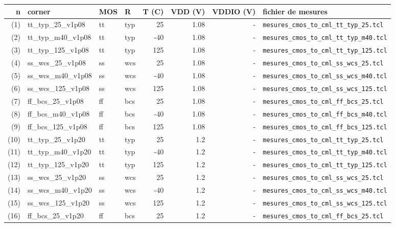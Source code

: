 \documentclass[a4paper,10pt,landscape]{article}
\begin{document}
\begin{longtable}{rlllrrrl}\toprule
n & corner & MOS & R & T (C) & VDD (V) & VDDIO (V) & fichier de mesures \\ \midrule\endhead
(1) & tt\_typ\_25\_v1p08 & tt & typ & 25 & 1.08 & - & {\small\texttt{mesures\_cmos\_to\_cml\_tt\_typ\_25.tcl}} \\
(2) & tt\_typ\_m40\_v1p08 & tt & typ & -40 & 1.08 & - & {\small\texttt{mesures\_cmos\_to\_cml\_tt\_typ\_m40.tcl}} \\
(3) & tt\_typ\_125\_v1p08 & tt & typ & 125 & 1.08 & - & {\small\texttt{mesures\_cmos\_to\_cml\_tt\_typ\_125.tcl}} \\
(4) & ss\_wcs\_25\_v1p08 & ss & wcs & 25 & 1.08 & - & {\small\texttt{mesures\_cmos\_to\_cml\_ss\_wcs\_25.tcl}} \\
(5) & ss\_wcs\_m40\_v1p08 & ss & wcs & -40 & 1.08 & - & {\small\texttt{mesures\_cmos\_to\_cml\_ss\_wcs\_m40.tcl}} \\
(6) & ss\_wcs\_125\_v1p08 & ss & wcs & 125 & 1.08 & - & {\small\texttt{mesures\_cmos\_to\_cml\_ss\_wcs\_125.tcl}} \\
(7) & ff\_bcs\_25\_v1p08 & ff & bcs & 25 & 1.08 & - & {\small\texttt{mesures\_cmos\_to\_cml\_ff\_bcs\_25.tcl}} \\
(8) & ff\_bcs\_m40\_v1p08 & ff & bcs & -40 & 1.08 & - & {\small\texttt{mesures\_cmos\_to\_cml\_ff\_bcs\_m40.tcl}} \\
(9) & ff\_bcs\_125\_v1p08 & ff & bcs & 125 & 1.08 & - & {\small\texttt{mesures\_cmos\_to\_cml\_ff\_bcs\_125.tcl}} \\
(10) & tt\_typ\_25\_v1p20 & tt & typ & 25 & 1.2 & - & {\small\texttt{mesures\_cmos\_to\_cml\_tt\_typ\_25.tcl}} \\
(11) & tt\_typ\_m40\_v1p20 & tt & typ & -40 & 1.2 & - & {\small\texttt{mesures\_cmos\_to\_cml\_tt\_typ\_m40.tcl}} \\
(12) & tt\_typ\_125\_v1p20 & tt & typ & 125 & 1.2 & - & {\small\texttt{mesures\_cmos\_to\_cml\_tt\_typ\_125.tcl}} \\
(13) & ss\_wcs\_25\_v1p20 & ss & wcs & 25 & 1.2 & - & {\small\texttt{mesures\_cmos\_to\_cml\_ss\_wcs\_25.tcl}} \\
(14) & ss\_wcs\_m40\_v1p20 & ss & wcs & -40 & 1.2 & - & {\small\texttt{mesures\_cmos\_to\_cml\_ss\_wcs\_m40.tcl}} \\
(15) & ss\_wcs\_125\_v1p20 & ss & wcs & 125 & 1.2 & - & {\small\texttt{mesures\_cmos\_to\_cml\_ss\_wcs\_125.tcl}} \\
(16) & ff\_bcs\_25\_v1p20 & ff & bcs & 25 & 1.2 & - & {\small\texttt{mesures\_cmos\_to\_cml\_ff\_bcs\_25.tcl}} \\

\end{longtable}
\end{document}

